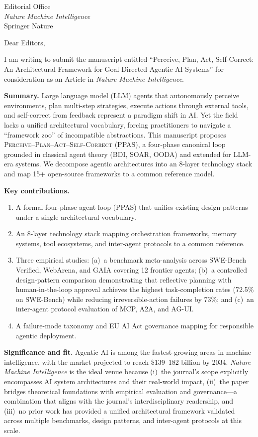 \documentclass[11pt]{letter}
\date{April 2, 2026}
\begin{document}
\begin{letter}{%
Editorial Office\\
\emph{Nature Machine Intelligence}\\
Springer Nature}

\opening{Dear Editors,}

I am writing to submit the manuscript entitled ``Perceive, Plan, Act, Self-Correct: An Architectural Framework for Goal-Directed Agentic AI Systems'' for consideration as an Article in \emph{Nature Machine Intelligence}.

\textbf{Summary.}
Large language model (LLM) agents that autonomously perceive environments, plan multi-step strategies, execute actions through external tools, and self-correct from feedback represent a paradigm shift in AI. Yet the field lacks a unified architectural vocabulary, forcing practitioners to navigate a ``framework zoo'' of incompatible abstractions. This manuscript proposes \textsc{Perceive--Plan--Act--Self-Correct} (PPAS), a four-phase canonical loop grounded in classical agent theory (BDI, SOAR, OODA) and extended for LLM-era systems. We decompose agentic architectures into an 8-layer technology stack and map 15+ open-source frameworks to a common reference model.

\textbf{Key contributions.}
\begin{enumerate}
    \item A formal four-phase agent loop (PPAS) that unifies existing design patterns under a single architectural vocabulary.
    \item An 8-layer technology stack mapping orchestration frameworks, memory systems, tool ecosystems, and inter-agent protocols to a common reference.
    \item Three empirical studies: (a)~a benchmark meta-analysis across SWE-Bench Verified, WebArena, and GAIA covering 12 frontier agents; (b)~a controlled design-pattern comparison demonstrating that reflective planning with human-in-the-loop approval achieves the highest task-completion rates (72.5\% on SWE-Bench) while reducing irreversible-action failures by 73\%; and (c)~an inter-agent protocol evaluation of MCP, A2A, and AG-UI.
    \item A failure-mode taxonomy and EU AI Act governance mapping for responsible agentic deployment.
\end{enumerate}

\textbf{Significance and fit.}
Agentic AI is among the fastest-growing areas in machine intelligence, with the market projected to reach \$139--182 billion by 2034. \emph{Nature Machine Intelligence} is the ideal venue because (i)~the journal's scope explicitly encompasses AI system architectures and their real-world impact, (ii)~the paper bridges theoretical foundations with empirical evaluation and governance---a combination that aligns with the journal's interdisciplinary readership, and (iii)~no prior work has provided a unified architectural framework validated across multiple benchmarks, design patterns, and inter-agent protocols at this scale.


\end{letter}
\end{document}
